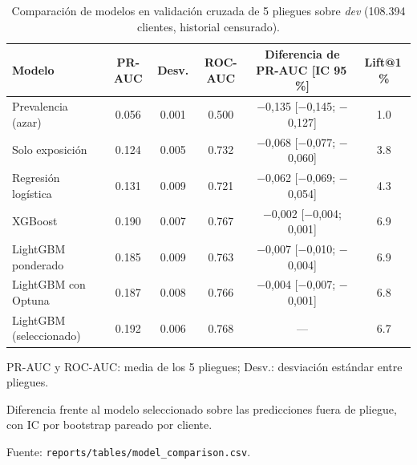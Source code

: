 \begin{table}[htbp]
  \centering
  \small
  \caption{Comparación de modelos en validación cruzada de 5 pliegues sobre \textit{dev} (108.394 clientes, historial censurado).}
  \label{tab:modelos}
  \begin{threeparttable}
    \begin{tabular}{l S[table-format=1.3] S[table-format=1.3] S[table-format=1.3] c S[table-format=1.1]}
      \toprule
      {Modelo} & {PR-AUC} & {Desv.} & {ROC-AUC} & {Diferencia de PR-AUC [IC 95\,\%]} & {Lift@1\,\%} \\
      \midrule
      Prevalencia (azar) & 0.056 & 0.001 & 0.500 & {$-$0,135 [$-$0,145; $-$0,127]} & 1.0 \\
      Solo exposición & 0.124 & 0.005 & 0.732 & {$-$0,068 [$-$0,077; $-$0,060]} & 3.8 \\
      Regresión logística & 0.131 & 0.009 & 0.721 & {$-$0,062 [$-$0,069; $-$0,054]} & 4.3 \\
      XGBoost & 0.190 & 0.007 & 0.767 & {$-$0,002 [$-$0,004; 0,001]} & 6.9 \\
      LightGBM ponderado & 0.185 & 0.009 & 0.763 & {$-$0,007 [$-$0,010; $-$0,004]} & 6.9 \\
      LightGBM con Optuna & 0.187 & 0.008 & 0.766 & {$-$0,004 [$-$0,007; $-$0,001]} & 6.8 \\
      LightGBM (seleccionado) & 0.192 & 0.006 & 0.768 & {---} & 6.7 \\
      \bottomrule
    \end{tabular}
    \begin{tablenotes}
      \footnotesize
      \item PR-AUC y ROC-AUC: media de los 5 pliegues; Desv.: desviación estándar entre pliegues.
      \item Diferencia frente al modelo seleccionado sobre las predicciones fuera de pliegue, con IC por bootstrap pareado por cliente.
      \item Fuente: \texttt{reports/tables/model\_comparison.csv}.
    \end{tablenotes}
  \end{threeparttable}
\end{table}
